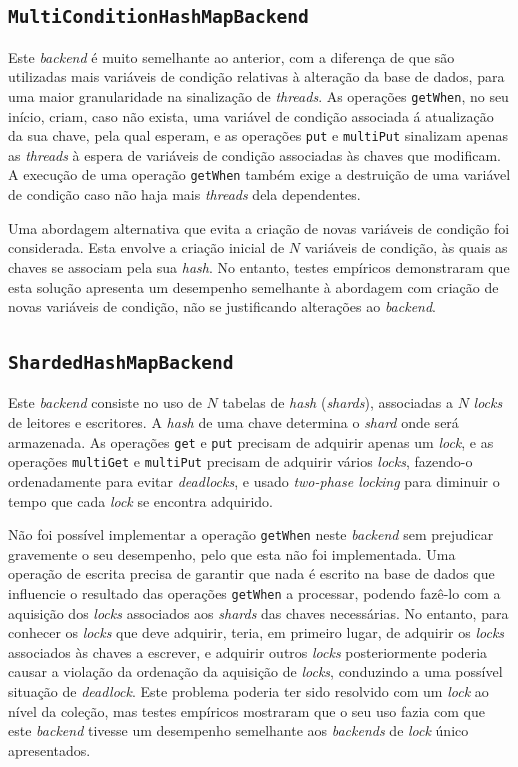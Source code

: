 \documentclass[11pt, a4paper]{article}
\begin{document}
\subsection{\texttt{MultiConditionHashMapBackend}}

Este \emph{backend} é muito semelhante ao anterior, com a diferença de que são utilizadas mais
variáveis de condição relativas à alteração da base de dados, para uma maior granularidade na
sinalização de \emph{threads}. As operações \texttt{getWhen}, no seu início, criam, caso não exista,
uma variável de condição associada á atualização da sua chave, pela qual esperam, e as operações
\texttt{put} e \texttt{multiPut} sinalizam apenas as \emph{threads} à espera de variáveis de
condição associadas às chaves que modificam. A execução de uma operação \texttt{getWhen} também
exige a destruição de uma variável de condição caso não haja mais \emph{threads} dela dependentes.

Uma abordagem alternativa que evita a criação de novas variáveis de condição foi considerada. Esta
envolve a criação inicial de $N$ variáveis de condição, às quais as chaves se associam pela sua
\emph{hash}. No entanto, testes empíricos demonstraram que esta solução apresenta um desempenho
semelhante à abordagem com criação de novas variáveis de condição, não se justificando alterações ao
\emph{backend}.

\subsection{\texttt{ShardedHashMapBackend}}

Este \emph{backend} consiste no uso de $N$ tabelas de \emph{hash} (\emph{shards}), associadas a $N$
\emph{locks} de leitores e escritores. A \emph{hash} de uma chave determina o \emph{shard} onde será
armazenada. As operações \texttt{get} e \texttt{put} precisam de adquirir apenas um \emph{lock}, e
as operações \texttt{multiGet} e \texttt{multiPut} precisam de adquirir vários \emph{locks},
fazendo-o ordenadamente para evitar \emph{deadlocks}, e usado \emph{two-phase locking} para diminuir
o tempo que cada \emph{lock} se encontra adquirido.

Não foi possível implementar a operação \texttt{getWhen} neste \emph{backend} sem prejudicar
gravemente o seu desempenho, pelo que esta não foi implementada. Uma operação de escrita precisa de
garantir que nada é escrito na base de dados que influencie o resultado das operações
\texttt{getWhen} a processar, podendo fazê-lo com a aquisição dos \emph{locks} associados aos
\emph{shards} das chaves necessárias. No entanto, para conhecer os \emph{locks} que deve adquirir,
teria, em primeiro lugar, de adquirir os \emph{locks} associados às chaves a escrever, e adquirir
outros \emph{locks} posteriormente poderia causar a violação da ordenação da aquisição de
\emph{locks}, conduzindo a uma possível situação de \emph{deadlock}. Este problema poderia ter sido
resolvido com um \emph{lock} ao nível da coleção, mas testes empíricos mostraram que o seu uso fazia
com que este \emph{backend} tivesse um desempenho semelhante aos \emph{backends} de \emph{lock}
único apresentados.
\end{document}
